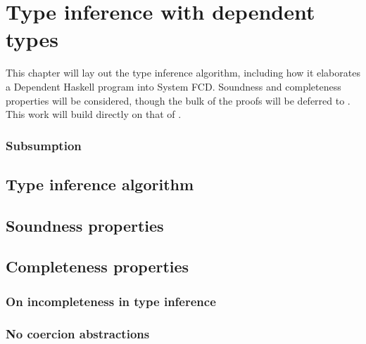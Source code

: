 \chapter{Type inference with dependent types}
\label{cha:type-inference}

\begin{proposal}
This chapter will lay out the type inference algorithm, including how it
elaborates a Dependent Haskell program into System FCD. Soundness and
completeness properties will be considered, though the bulk of the proofs
will be deferred to . This work will build directly
on that of \citet{outsidein}.
\end{proposal}

\subsection{Subsumption}
\label{sec:subsumption}

\section{Type inference algorithm}

\section{Soundness properties}

\section{Completeness properties}

\subsection{On incompleteness in type inference}
\label{sec:incomplete}

\subsection{No coercion abstractions}
\label{sec:no-coercion-abstractions}

